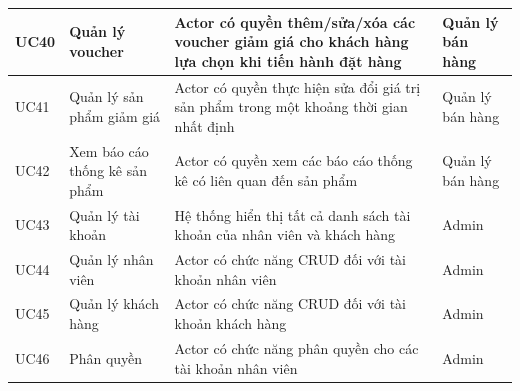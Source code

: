 \documentclass[12pt,a4paper,2sides]{report}
\begin{document}
\begin{tabular}{|p{1cm}|p{3cm}|p{6cm}|p{3cm}|}
     \hline
UC40 & Quản lý voucher                        & Actor có quyền thêm/sửa/xóa các voucher giảm giá cho khách hàng lựa chọn khi tiến hành đặt hàng                                                                                                                                          & Quản lý bán hàng                                                        \\ 
\hline
UC41 & Quản lý sản phẩm giảm giá              & Actor có quyền thực hiện sửa đổi giá trị sản phẩm trong một khoảng thời gian nhất định                                                                                                                                                   & Quản lý bán hàng                                                        \\ 
\hline
UC42 & Xem báo cáo thống kê sản phẩm          & Actor có quyền xem các báo cáo thống kê có liên quan đến sản phẩm                                                                                                                                                                        & Quản lý bán hàng                                                        \\ 
\hline
UC43 & Quản lý tài khoản                      & Hệ thống hiển thị tất cả danh sách tài khoản của nhân viên và khách hàng                                                                                                                                                                 & Admin                                                                   \\ 
\hline
UC44 & Quản lý nhân viên                      & Actor có chức năng CRUD đối với tài khoản nhân viên                                                                                                                                                                                      & Admin                                                                   \\ 
\hline
UC45 & Quản lý khách hàng                     & Actor có chức năng CRUD đối với tài khoản khách hàng                                                                                                                                                                                     & Admin                                                                   \\ 
\hline
UC46 & Phân quyền                             & Actor có chức năng phân quyền cho các tài khoản nhân viên                                                                                                                                                                                & Admin                                                                   \\ 
\hline
\end{tabular}
\end{document}
